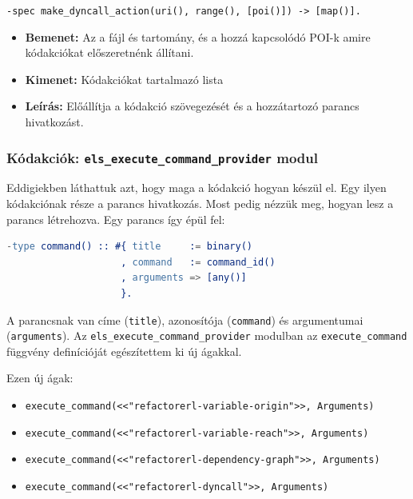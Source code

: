\noindent   \lstinline{-spec make_dyncall_action(uri(), range(), [poi()]) -> [map()].}
    \begin{itemize}
        \item \textbf{Bemenet:} Az a fájl és tartomány, és a hozzá kapcsolódó POI-k amire kódakciókat előszeretnénk állítani.
        \item \textbf{Kimenet:} Kódakciókat tartalmazó lista
        \item \textbf{Leírás:} Előállítja a kódakció szövegezését és a hozzátartozó parancs hivatkozást.
    \end{itemize}


\subsubsection{Kódakciók: \lstinline{els_execute_command_provider} modul }

Eddigiekben láthattuk azt, hogy maga a kódakció hogyan készül el. Egy ilyen kódakciónak része a parancs hivatkozás. Most pedig nézzük meg, hogyan lesz a parancs létrehozva. Egy parancs így épül fel:

\lstset{caption=Egy példa a parancsra, label=src:erlang0commanExample}
\begin{lstlisting}[language={erlang}]
-type command() :: #{ title     := binary()
                    , command   := command_id()
                    , arguments => [any()]
                    }.
\end{lstlisting}

A parancsnak van címe (\lstinline{title}), azonosítója (\lstinline{command}) és argumentumai (\lstinline{arguments}). Az \lstinline{els_execute_command_provider} modulban az \lstinline{execute_command} függvény definícióját egészítettem ki új ágakkal.

Ezen új ágak:
\begin{itemize}
    \item \lstinline{execute_command(<<"refactorerl-variable-origin">>, Arguments)}
    \item \lstinline{execute_command(<<"refactorerl-variable-reach">>, Arguments)}
    \item \lstinline{execute_command(<<"refactorerl-dependency-graph">>, Arguments)}
    \item \lstinline{execute_command(<<"refactorerl-dyncall">>, Arguments)}
\end{itemize}

